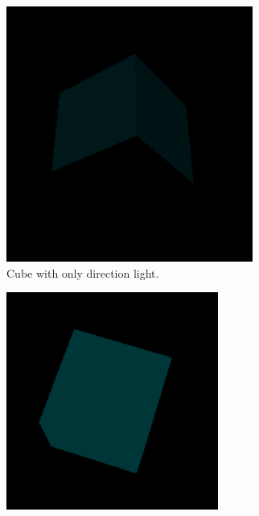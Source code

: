 \documentclass[12pt]{article}
\begin{document}
\begin{figure}[!h]
\centering
    \begin{subfigure}{.33\textwidth}
        \centering
        \includegraphics[width = \textwidth]{figs/ex_23_1.png}
        \caption{Cube with only direction light.}
        \label{fig:ex_23_1}
    \end{subfigure}%
    \begin{subfigure}{.33\textwidth}
        \centering
        \includegraphics[width = \textwidth]{figs/ex_23_2.png}

\end{subfigure}
\end{figure}
\end{document}
